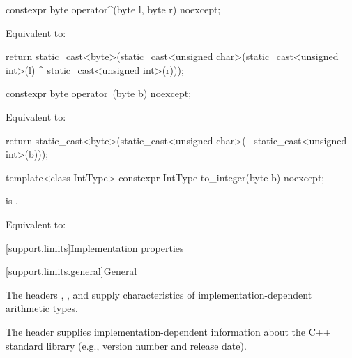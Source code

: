 %
\begin{itemdecl}
constexpr byte operator^(byte l, byte r) noexcept;
\end{itemdecl}

\begin{itemdescr}
\pnum \effects Equivalent to:
\begin{codeblock}
return static_cast<byte>(static_cast<unsigned char>(static_cast<unsigned int>(l) ^
                                                    static_cast<unsigned int>(r)));
\end{codeblock}
\end{itemdescr}

%
\begin{itemdecl}
constexpr byte operator~(byte b) noexcept;
\end{itemdecl}

\begin{itemdescr}
\pnum \effects Equivalent to:
\begin{codeblock}
return static_cast<byte>(static_cast<unsigned char>(
	                   ~static_cast<unsigned int>(b)));
\end{codeblock}
\end{itemdescr}

%
\begin{itemdecl}
template<class IntType>
  constexpr IntType to_integer(byte b) noexcept;
\end{itemdecl}

\begin{itemdescr}
\pnum \constraints {} is .

\pnum \effects Equivalent to: 
\end{itemdescr}

[support.limits]{Implementation properties}

[support.limits.general]{General}

\pnum
The headers
,
, and
supply characteristics of
%
imple\-mentation-dependent
arithmetic types.

\pnum
The header 
supplies implementation-dependent information
about the C++ standard library
(e.g., version number and release date).

